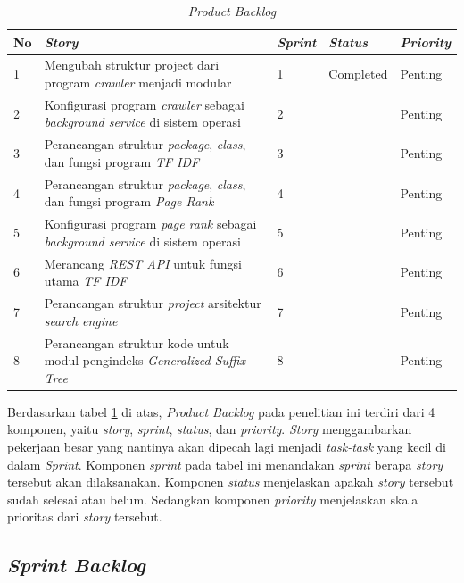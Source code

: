 \begin{table}[H]
	\caption{\textit{Product Backlog}}
	\label{product_backlog}
	\begin{tabular}{@{} |p{0.5cm}|p{7cm}|p{1.5cm}|p{2cm}|p{2cm}| @{}}
		\hline
		\textbf{No} & \textbf{\textit{Story}} & \textbf{\textit{Sprint}} & \textbf{\textit{Status}} & \textbf{\textit{Priority}} \\
		\hline
		1 & Mengubah struktur project dari program \textit{crawler} menjadi modular & 1 & Completed & Penting \\
		\hline
		2 & Konfigurasi program \textit{crawler} sebagai \textit{background service} di sistem operasi & 2 & & Penting \\
		\hline
		3 & Perancangan struktur \textit{package}, \textit{class}, dan fungsi program \textit{TF IDF} & 3 & & Penting \\
		\hline
		4 & Perancangan struktur \textit{package}, \textit{class}, dan fungsi program \textit{Page Rank} & 4 & & Penting \\
		\hline
		5 & Konfigurasi program \textit{page rank} sebagai \textit{background service} di sistem operasi & 5 & & Penting \\
		\hline
		6 & Merancang \textit{REST API} untuk fungsi utama \textit{TF IDF} & 6 & & Penting \\
		\hline
		7 & Perancangan struktur \textit{project} arsitektur \textit{search engine} & 7 & & Penting \\
		\hline
		8 & Perancangan struktur kode untuk modul pengindeks \textit{Generalized Suffix Tree} & 8 & & Penting \\
		\hline
	\end{tabular}
\end{table}

Berdasarkan tabel \ref{product_backlog} di atas, \textit{Product Backlog} pada penelitian ini terdiri dari 4 komponen, yaitu \textit{story}, \textit{sprint}, \textit{status}, dan \textit{priority}. \textit{Story} menggambarkan pekerjaan besar yang nantinya akan dipecah lagi menjadi \textit{task-task} yang kecil di dalam \textit{Sprint}. Komponen \textit{sprint} pada tabel ini menandakan \textit{sprint} berapa \textit{story} tersebut akan dilaksanakan. Komponen \textit{status} menjelaskan apakah \textit{story} tersebut sudah selesai atau belum.  Sedangkan komponen \textit{priority} menjelaskan skala prioritas dari \textit{story} tersebut.

\subsection{\textit{Sprint Backlog}}

